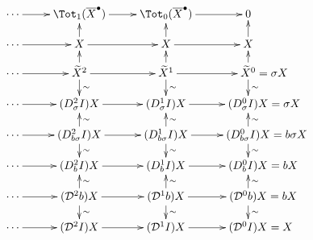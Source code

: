 \documentclass[10pt]{article}
\newcommand{\dupdown}[2]{D^{\smash{#1}}_{\smash{#2}}}
\newcommand{\caldup}[1]{\calD^{\smash{#1}}}
\begin{document}
\begin{convergence}
\[\xymatrix@R=4mm{
\cdots 
\ar[r]
&%
\Tot_{1}(\overline{X}^\bullet)
\ar[r]
&%
\Tot_0(\overline{X}^\bullet)
\ar[r]&%
0
\\
\cdots
\ar[r]
&%
X
\ar[u]
\ar[r]
&%
X
\ar[u]
\ar[r]&%
X\ar[u]
\\
\cdots 
\ar[r]
&%
\widetilde{X}^2
\ar[u]_-{}
\ar[d]^-{\sim}
\ar[r]
&%
\widetilde{X}^1
\ar[u]_-{}
\ar[d]^-{\sim}
\ar[r]&%
\widetilde{X}^0\makebox[0pt][l]{$\mbox{}=\sigma X$}
\ar[u]_-{}
\ar[d]^-{\sim}\\
\cdots 
\ar[r]
&%
(\dupdown{2}{\sigma} I)X
\ar[r]
&%
(\dupdown{1}{\sigma} I)X
\ar[r]&%
(\dupdown{0}{\sigma} I)X\makebox[0pt][l]{$\mbox{}=\sigma X$}\\
\cdots 
\ar[r]
&%
(\dupdown{2}{b\sigma} I)X
\ar[u]_-{\sim}
\ar[d]^-{\sim}
\ar[r]
&%
(\dupdown{1}{b\sigma} I)X
\ar[u]_-{\sim}
\ar[d]^-{\sim}
\ar[r]&%
(\dupdown{0}{b\sigma} I)X\makebox[0pt][l]{$\mbox{}={b\sigma} X$}
\ar[u]_-{\sim}
\ar[d]^-{\sim}\\
\cdots 
\ar[r]
&%
(\dupdown{2}{b}I)X
\ar[r]
&%
(\dupdown{1}{b}I)X
\ar[r]&%
(\dupdown{0}{b}I)X\makebox[0pt][l]{$\mbox{}=bX$}\\
\cdots 
\ar[r]
&%
(\caldup{2}b)X
\ar[u]_-{\sim}
\ar[d]^-{\sim}
\ar[r]
&%
(\caldup{1}b)X
\ar[u]_-{\sim}
\ar[d]^-{\sim}
\ar[r]&%
(\caldup{0}b)X\makebox[0pt][l]{$\mbox{}=bX$}
\ar[u]_-{\sim}
\ar[d]^-{\sim}\\
\cdots 
\ar[r]
&%
(\caldup{2}I)X
\ar[r]
&%
(\caldup{1}I)X
\ar[r]&%
(\caldup{0}I)X\makebox[0pt][l]{$\mbox{}=X$}
}\]


\end{convergence}
\end{document}
